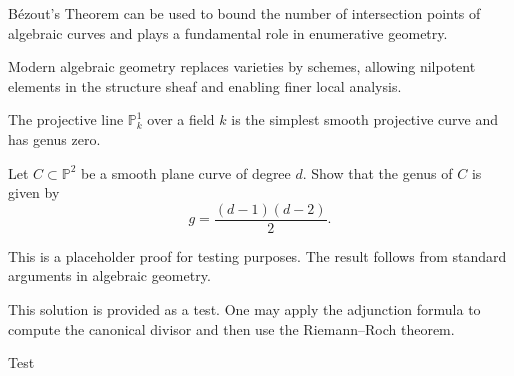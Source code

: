 \documentclass[lang=en,12pt]{beautybook}
\begin{document}
\begin{application}\label{application:2}
  B\'ezout's Theorem can be used to bound the number of intersection points
  of algebraic curves and plays a fundamental role in enumerative geometry.
\end{application}

\begin{RemarK}\label{Remark:2}
  Modern algebraic geometry replaces varieties by schemes,
  allowing nilpotent elements in the structure sheaf and enabling finer local analysis.
\end{RemarK}

\begin{Example}\label{Example:2}
  The projective line $\mathbb{P}^1_k$ over a field $k$
  is the simplest smooth projective curve and has genus zero.
\end{Example}

\begin{Problem}\label{Problem:2}
  Let $C \subset \mathbb{P}^2$ be a smooth plane curve of degree $d$.
  Show that the genus of $C$ is given by
  \[
    g = \frac{(d-1)(d-2)}{2}.
  \]
\end{Problem}

\begin{Proof}
  This is a placeholder proof for testing purposes.
  The result follows from standard arguments in algebraic geometry.
\end{Proof}

\begin{Solution}
  This solution is provided as a test.
  One may apply the adjunction formula to compute the canonical divisor
  and then use the Riemann--Roch theorem.
\end{Solution}

Test























\printbibliography[heading=bibintoc,title={Bibliography}]\printindex\thispagestyle{empty}
\ISBNcode{\EANisbn[ISBN=978-80-7340-097-2]} %
\makebottomcover
\end{document}
